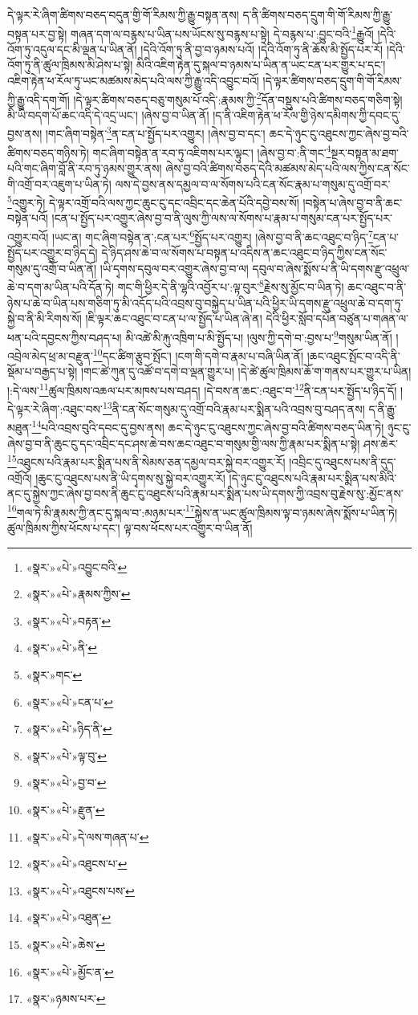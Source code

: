 དེ་ལྟར་རེ་ཞིག་ཚིགས་བཅད་བདུན་གྱི་གོ་རིམས་ཀྱི་རྒྱུ་བསྟན་ནས། ད་ནི་ཚིགས་བཅད་དྲུག་གི་གོ་རིམས་ཀྱི་རྒྱུ་བསྟན་པར་བྱ་སྟེ། གཞན་དག་ལ་བརྙས་པ་ཡིན་པས་ཡོངས་སུ་བརྙས་པ་སྟེ། དེ་བརྙས་པ་:བྱུང་བའི་\footnote{«སྣར་»«པེ་»འབྱུང་བའི་}རྒྱུའོ། །དེའི་འོག་ཏུ་འདུལ་དང་མི་ལྡན་པ་ཡིན་ནོ། །དེའི་འོག་ཏུ་ནི་བྱ་བ་ཉམས་པའོ། །དེའི་འོག་ཏུ་ནི་ཆོས་མི་སྤྱོད་པར་རོ། །དེའི་འོག་ཏུ་ནི་ཚུལ་ཁྲིམས་མི་ཤེས་པ་སྟེ། མིའི་འཇིག་རྟེན་དུ་སྐལ་བ་ཉམས་པ་ཡིན་ན་ཡང་ངན་པར་གྱུར་པ་དང་། འཇིག་རྟེན་ཕ་རོལ་ཏུ་ཡང་མཚམས་མེད་པའི་ལས་ཀྱི་རྒྱུ་འདི་འབྱུང་བའོ། །དེ་ལྟར་ཚིགས་བཅད་དྲུག་གི་གོ་རིམས་ཀྱི་རྒྱུ་འདི་དག་གོ། །དེ་ལྟར་ཚིགས་བཅད་བཅུ་གསུམ་པོ་འདི་:རྣམས་ཀྱི་\footnote{«སྣར་»«པེ་»རྣམས་ཀྱིས་}དོན་བསྡུས་པའི་ཚིགས་བཅད་གཅིག་སྟེ། མི་ཡི་བདག་པོ་ཆང་འདི་དེ་འདྲ་ཡང་། །ཞེས་བྱ་བ་ཡིན་ནོ། །ད་ནི་འཇིག་རྟེན་ཕ་རོལ་གྱི་ཉེས་དམིགས་ཀྱི་དབང་དུ་བྱས་ནས། །གང་ཞིག་བསྟེན་\footnote{«སྣར་»«པེ་»བརྟན་}ན་ངན་པ་སྤྱོད་པར་འགྱུར། །ཞེས་བྱ་བ་དང་། ཆང་དེ་ཉུང་ངུ་འཐུངས་ཀྱང་ཞེས་བྱ་བའི་ཚིགས་བཅད་གཉིས་ཏེ། གང་ཞིག་བསྟེན་ན་རབ་ཏུ་འཇིགས་པར་ལྟུང་། །ཞེས་བྱ་བ་:ནི་གང་\footnote{«སྣར་»«པེ་»ནི་}སྔར་བསྟན་མ་ཐག་པའི་གང་ཞིག་བློ་ནི་རབ་ཏུ་ཉམས་གྱུར་ནས། ཞེས་བྱ་བའི་ཚིགས་བཅད་དེའི་མཚམས་མེད་པའི་ལས་ཀྱིས་ངན་སོང་གི་འགྲོ་བར་འཇུག་པ་ཡིན་ཏེ། ལས་དེ་བྱས་ནས་དམྱལ་བ་ལ་སོགས་པའི་ངན་སོང་རྣམ་པ་གསུམ་དུ་འགྲོ་བར་\footnote{«སྣར་»གང་}འགྱུར་ཏེ། དེ་ལྟར་འགྲོ་བའི་ལས་ཀྱང་ཆུང་ངུ་དང་འབྲིང་དང་ཆེན་པོའི་དབྱེ་བས་སོ། །བསྟེན་པ་ཞེས་བྱ་བ་ནི་ཆང་བསྟེན་པའོ། །ངན་པ་སྤྱོད་པར་འགྱུར་ཞེས་བྱ་བ་ནི་ལུས་ཀྱི་ལས་ལ་སོགས་པ་རྣམ་པ་གསུམ་ངན་པར་སྤྱོད་པར་འགྱུར་བའོ། །ཡང་ན། གང་ཞིག་བསྟེན་ན་:ངན་པར་\footnote{«སྣར་»«པེ་»ངན་པ་}སྤྱོད་པར་འགྱུར། །ཞེས་བྱ་བ་ནི་ཆང་འཐུང་བ་ཉིད་\footnote{«སྣར་»«པེ་»ཉིད་ནི་}ངན་པ་སྤྱོད་པར་འགྱུར་བ་ཉིད་དེ། དེ་ཉིད་ཤས་ཆེ་བ་ལ་སོགས་པ་བསྟན་པ་འདིས་ན་ཆང་འཐུང་བ་ཉིད་ཀྱིས་ངན་སོང་གསུམ་དུ་འགྲོ་བ་ཡིན་ནོ། །ཡི་དྭགས་དབུལ་བར་འགྱུར་ཞེས་བྱ་བ་ལ། དབུལ་བ་ཞེས་སྨོས་པ་ནི་ཡི་དགས་རྫུ་འཕྲུལ་ཆེ་བ་དག་མ་ཡིན་པའི་དོན་ཏེ། གང་གི་ཕྱིར་དེ་ནི་ལྷའི་འབྱོར་པ་:ལྟ་བུར་\footnote{«སྣར་»«པེ་»ལྟ་བུ་}རྗེས་སུ་མྱོང་བ་ཡིན་ཏེ། ཆང་འཐུང་བ་ནི་ཉེས་པ་ཆེ་བ་ཡིན་པས་གཅིག་ཏུ་མི་འདོད་པའི་འབྲས་བུ་བསྐྱེད་པ་ཡིན་པའི་ཕྱིར་ཡི་དགས་རྫུ་འཕྲུལ་ཆེ་བ་དག་ཏུ་སྐྱེ་བ་ནི་མི་རིགས་སོ། །ཇི་ལྟར་ཆང་འཐུང་བ་ངན་པ་ལ་སྤྱོད་པ་ཡིན་ཞེ་ན། དེའི་ཕྱིར་སློབ་དཔོན་བཙུན་པ་གཞན་ལ་ཕན་པའི་དབྱངས་ཀྱིས་བཤད་པ། མི་འཚེ་མི་རྐུ་འཁྲིག་པ་མི་སྤྱོད་པ། །ལུས་ཀྱི་དགེ་བ་:བྱས་པ་\footnote{«སྣར་»«པེ་»བྱ་བ་}གསུམ་ཡིན་ནོ། །འབྲེལ་མེད་ཕྲ་མ་བརྫུན་\footnote{«སྣར་»«པེ་»རྫུན་}དང་ཚིག་རྩུབ་སྤོང་། །ངག་གི་དགེ་བ་རྣམ་པ་བཞི་ཡིན་ནོ། །ཆང་འཐུང་སྤོང་བ་འདི་ནི་སྡོམ་པ་བརྒྱད་པ་སྟེ། །གང་ཚེ་ཀུན་དུ་འཚོ་བ་དགེ་བ་ལྡན་གྱུར་པ། །དེ་ཚེ་ཚུལ་ཁྲིམས་ཆོ་ག་གནས་པར་གྱུར་པ་ཡིན། །:དེ་ལས་\footnote{«སྣར་»«པེ་»དེ་ལས་གཞན་པ་}ཚུལ་ཁྲིམས་འཆལ་པར་མཁས་པས་བཤད། །དེ་བས་ན་ཆང་:འཐུང་བ་\footnote{«སྣར་»«པེ་»འཐུངས་པ་}ནི་ངན་པར་སྤྱོད་པ་ཉིད་དོ། །དེ་ལྟར་རེ་ཞིག་:འཐུང་བས་\footnote{«སྣར་»«པེ་»འཐུངས་པས་}ནི་ངན་སོང་གསུམ་དུ་འགྲོ་བའི་རྣམ་པར་སྨིན་པའི་འབྲས་བུ་བཤད་ནས། ད་ནི་རྒྱུ་མཐུན་\footnote{«སྣར་»«པེ་»འཐུན་}པའི་འབྲས་བུའི་དབང་དུ་བྱས་ནས། ཆང་དེ་ཉུང་ངུ་འཐུངས་ཀྱང་ཞེས་བྱ་བའི་ཚིགས་བཅད་ཡིན་ཏེ། ཉུང་ངུ་ཞེས་བྱ་བ་ནི་ཆུང་ངུ་དང་འབྲིང་དང་ཤས་ཆེ་བས་ཆང་འཐུང་བ་གསུམ་གྱི་ལས་ཀྱི་རྣམ་པར་སྨིན་པ་སྟེ། ཤས་ཆེར་\footnote{«སྣར་»«པེ་»ཆེས་}འཐུངས་པའི་རྣམ་པར་སྨིན་པས་ནི་སེམས་ཅན་དམྱལ་བར་སྐྱེ་བར་འགྱུར་རོ། །འབྲིང་དུ་འཐུངས་པས་ནི་དུད་འགྲོའོ། །ཆུང་ངུ་འཐུངས་པས་ནི་ཡི་དྭགས་སུ་སྐྱེ་བར་འགྱུར་རོ། །དེ་ཉུང་ངུ་འཐུངས་པའི་རྣམ་པར་སྨིན་པས་མིའི་ནང་དུ་སྐྱེས་ཀྱང་ཞེས་བྱ་བས་ནི་ཆུང་ངུ་འཐུངས་པའི་རྣམ་པར་སྨིན་པས་ཡི་དགས་ཀྱི་འབྲས་བུ་རྗེས་སུ་:མྱོང་ནས་\footnote{«སྣར་»«པེ་»མྱོང་ན་}གལ་ཏེ་མི་རྣམས་ཀྱི་ནང་དུ་སྐལ་བ་:མཉམ་པར་\footnote{«སྣར་»ཉམས་པར་}སྐྱེས་ན་ཡང་ཚུལ་ཁྲིམས་ལྟ་བ་ཉམས་ཞེས་སྨོས་པ་ཡིན་ཏེ། ཚུལ་ཁྲིམས་ཀྱིས་ཕོངས་པ་དང་། ལྟ་བས་ཕོངས་པར་འགྱུར་བ་ཡིན་ནོ། 